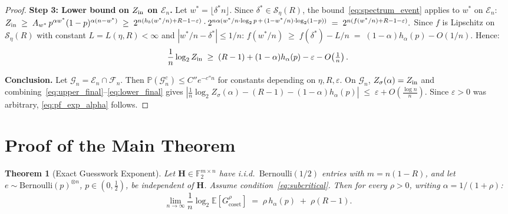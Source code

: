 \documentclass[journal,10pt,onecolumn]{IEEEtran}
\newtheorem{theorem}{Theorem}
\newcommand{\Fb}{\mathbb{F}}
\newcommand{\Eb}{\mathbb{E}}
\newcommand{\Pb}{\mathbb{P}}
\newcommand{\Hb}{h_b}
\newcommand{\Seta}{\mathcal{S}}
\newcommand{\Hm}{\mathbf{H}}
\begin{document}
\begin{proof}
 
\noindent\textbf{Step 3: Lower bound on $Z_{\rm in}$ on $\mathcal{E}_n$.}
Let $w^*=\lfloor\delta^* n\rfloor$.
Since $\delta^*\in\Seta_\eta(R)$, the bound~\eqref{eq:spectrum_event}
applies to $w^*$ on $\mathcal{E}_n$:
\(
    Z_{\rm in}
    \;\ge\;
    A_{w^*}\,p^{\alpha w^*}(1-p)^{\alpha(n-w^*)}
    \;\ge\;
    2^{n(\Hb(w^*/n)+R-1-\varepsilon)}\cdot
    2^{n\alpha(w^*/n\cdot\log_2 p\,+\,(1-w^*/n)\cdot\log_2(1-p))}
    \;=\;
    2^{n(f(w^*/n)+R-1-\varepsilon)}.
\)
Since $f$ is Lipschitz on $\Seta_\eta(R)$ with constant
$L=L(\eta,R)<\infty$ and $|w^*/n-\delta^*|\le 1/n$:
\(
    f(w^*/n)\;\ge\; f(\delta^*)-L/n
    \;=\;(1-\alpha)h_\alpha(p)-O(1/n).
\)
Hence:
\begin{equation}
    \frac{1}{n}\log_2 Z_{\rm in}
    \;\ge\;
    (R-1)+(1-\alpha)h_\alpha(p)-\varepsilon-O\!\left(\tfrac{1}{n}\right).
    \label{eq:lower_final}
\end{equation}

 
\noindent\textbf{Conclusion.}
Let $\mathcal{G}_n=\mathcal{E}_n\cap\mathcal{F}_n$.
Then $\Pb(\mathcal{G}_n^c)\le C''e^{-c''n}$ for constants
depending on $\eta,R,\varepsilon$.
On $\mathcal{G}_n$, $Z_\sigma(\alpha)=Z_{\rm in}$ and
combining~\eqref{eq:upper_final}--\eqref{eq:lower_final} gives
\(
    \left|
    \frac{1}{n}\log_2 Z_\sigma(\alpha)
    -(R-1)-(1-\alpha)h_\alpha(p)
    \right|
    \;\le\;
    \varepsilon+O\!\left(\tfrac{\log n}{n}\right).
\)
Since $\varepsilon>0$ was arbitrary, \eqref{eq:pf_exp_alpha} follows.
\end{proof}


\section{Proof of the Main Theorem}
\label{sec:main_proof}

\begin{theorem}[Exact Guesswork Exponent]
\label{thm:main}
Let $\Hm \in\Fb_2^{m\times n}$ have i.i.d.\ $\mathrm{Bernoulli}(1/2)$
entries with $m=n(1-R)$, and let
$e\sim\mathrm{Bernoulli}(p)^{\otimes n}$, $p\in(0,\tfrac{1}{2})$,
be independent of $\Hm$.
Assume condition~\eqref{eq:subcritical}.
Then for every $\rho>0$, writing $\alpha=1/(1+\rho)$:
\begin{equation}
    \lim_{n\to\infty}
    \frac{1}{n}\log_2\Eb\!\left[G_{\mathrm{coset}}^{\rho}\right]
    \;=\;
    \rho\,h_{\alpha}(p)\;+\;\rho(R-1).
    \label{eq:main}
\end{equation}
\end{theorem}
\end{document}
